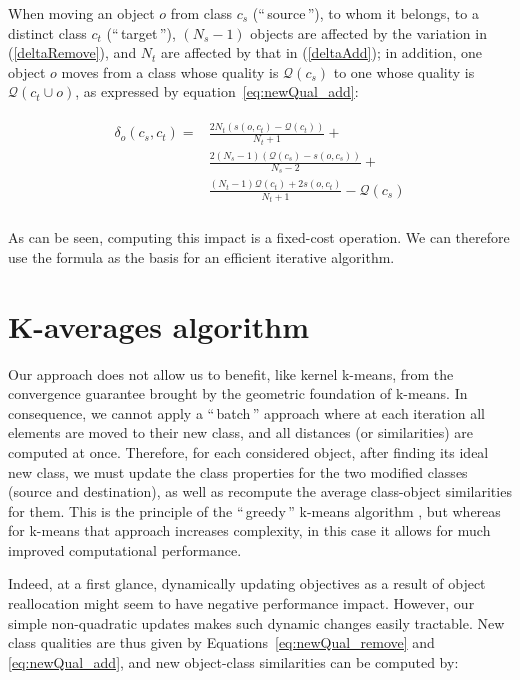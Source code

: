 \documentclass[10pt,journal,compsoc]{IEEEtran}
\newcommand{\gl}[1]{``\,#1\,''} %
\begin{document}
When moving an object $o$ from class $c_s$ (\gl{source}), to whom it belongs, to a
distinct class $c_t$ (\gl{target}), $(N_s-1)$ objects are affected
by the variation in (\ref{deltaRemove}), and $N_t$ are affected
by that in (\ref{deltaAdd}); in addition, one object $o$ moves from a class whose quality is $\mathcal{Q}(c_s)$ to one whose quality is $\mathcal{Q}\left(c_t \cup o\right)$, as expressed by equation~\ref{eq:newQual_add}:

\begin{align}
\begin{split}
  \delta_o(c_s, c_t) = & \frac{2N_t \left(s\left(o, c_t\right)-\mathcal{Q}(c_t)\right)}{N_t+1} + \\
&  \frac{2(N_s-1)\left( \mathcal{Q}(c_s) - s\left(o, c_s\right)\right)}{N_s-2}  + \\
 &  \frac{(N_t-1) \mathcal{Q}(c_t)  + 2s\left(o, c_t\right)}{N_t+1} - \mathcal{Q}(c_s) \\
\end{split}
  \label{eq:impact_classnorm}
\end{align}

As can be seen, computing this impact is a fixed-cost operation. We can therefore use the formula as the basis for an efficient iterative algorithm.

\section{K-averages algorithm}
\label{sec:algo}

Our approach does not allow us to benefit, like kernel k-means, from the convergence guarantee brought by the geometric foundation of k-means. In consequence, we cannot apply a \gl{batch} approach where at each iteration all elements are moved to their new class, and all distances (or similarities) are computed at once. Therefore, for each considered object, after finding its ideal new class, we must update the class properties for the two modified classes (source and destination), as well as recompute the average class-object similarities for them. This is the principle of the \gl{greedy} k-means algorithm \cite[Chapter10.8]{Duda01}, but whereas for k-means that approach increases complexity, in this case it allows for much improved computational performance.

Indeed, at a first glance, dynamically updating objectives as a result of object reallocation might seem to have negative performance impact. However, our simple non-quadratic updates makes such dynamic changes easily tractable. New class qualities are thus given by Equations~\ref{eq:newQual_remove} and \ref{eq:newQual_add}, and new object-class similarities can be computed by:
\end{document}
